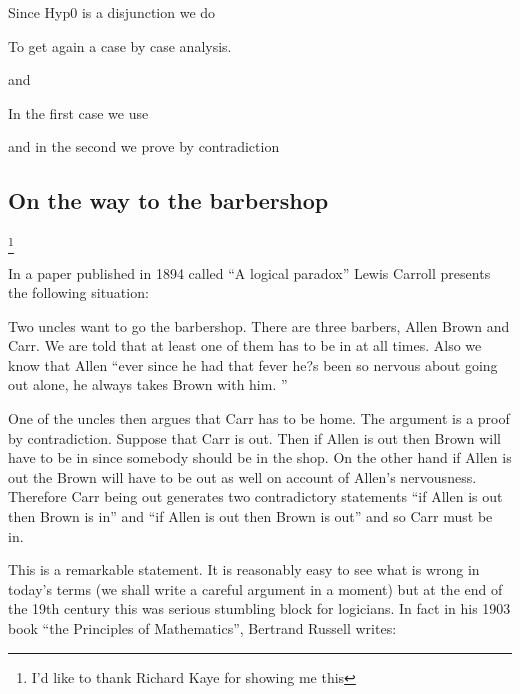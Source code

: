 Since Hyp0 is a disjunction we do

To get again a case by case analysis.


and


In the first case we use


and in the second we prove by contradiction

\subsection{On the way to the barbershop}\footnote{I'd like to thank Richard Kaye for showing me this}

In a paper published in 1894 called ``A logical paradox'' Lewis Carroll presents the following situation:

Two uncles want to go the barbershop. There are three barbers, Allen Brown and Carr. We are told that at least one of them has to be in at all times. Also we know that Allen  ``ever since he had that fever he?s been so nervous about going out alone, he always takes Brown with him. '' 

One of the uncles then argues that Carr has to be home. The argument is a proof by contradiction. Suppose that Carr is out.  Then if Allen is out then Brown will have to be in since somebody should be in the shop. On the other hand if Allen is out the Brown will have to be out as well on account of Allen's nervousness. Therefore Carr being out generates two contradictory statements ``if Allen is out then Brown is in'' and ``if Allen is out then Brown is out'' and so Carr must be in.

This is a remarkable statement. It is reasonably easy to see what is wrong in today's terms (we shall write a careful argument in a moment) but  at the end of the 19th century  this was serious stumbling block for logicians. In fact in his 1903 book  ``the Principles of Mathematics'', Bertrand  Russell writes:

